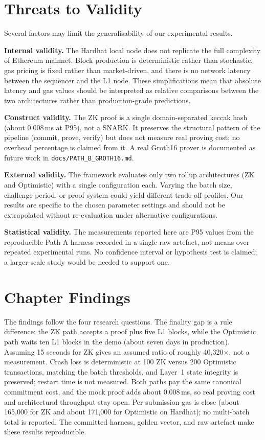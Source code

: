\section{Threats to Validity}

Several factors may limit the generalisability of our experimental results.

\textbf{Internal validity.} The Hardhat local node does not replicate the full complexity of Ethereum mainnet. Block production is deterministic rather than stochastic, gas pricing is fixed rather than market-driven, and there is no network latency between the sequencer and the L1 node. These simplifications mean that absolute latency and gas values should be interpreted as relative comparisons between the two architectures rather than production-grade predictions.

\textbf{Construct validity.} The ZK proof is a single domain-separated keccak hash (about 0.008\,ms at P95), not a SNARK. It preserves the structural pattern of the pipeline (commit, prove, verify) but does not measure real proving cost; no overhead percentage is claimed from it. A real Groth16 prover is documented as future work in \texttt{docs/PATH\_B\_GROTH16.md}.

\textbf{External validity.} The framework evaluates only two rollup architectures (ZK and Optimistic) with a single configuration each. Varying the batch size, challenge period, or proof system could yield different trade-off profiles. Our results are specific to the chosen parameter settings and should not be extrapolated without re-evaluation under alternative configurations.

\textbf{Statistical validity.} The measurements reported here are P95 values from the reproducible Path A harness recorded in a single raw artefact, not means over repeated experimental runs. No confidence interval or hypothesis test is claimed; a larger-scale study would be needed to support one.

\section{Chapter Findings}

The findings follow the four research questions. The finality gap is a rule difference: the ZK path accepts a proof plus five L1 blocks, while the Optimistic path waits ten L1 blocks in the demo (about seven days in production). Assuming 15 seconds for ZK gives an assumed ratio of roughly 40,320$\times$, not a measurement. Crash loss is deterministic at 100 ZK versus 200 Optimistic transactions, matching the batch thresholds, and Layer~1 state integrity is preserved; restart time is not measured. Both paths pay the same canonical commitment cost, and the mock proof adds about 0.008\,ms, so real proving cost and architectural throughput stay open. Per-submission gas is close (about 165,000 for ZK and about 171,000 for Optimistic on Hardhat); no multi-batch total is reported. The committed harness, golden vector, and raw artefact make these results reproducible.

